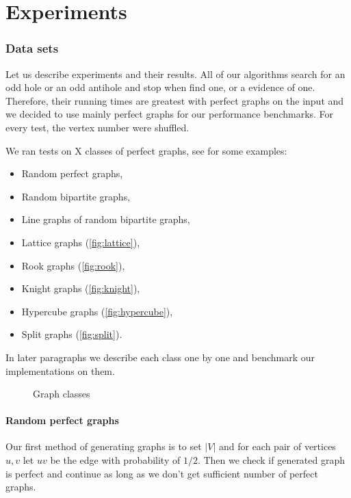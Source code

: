 \section{Experiments}
\label{sec:experiments}

\subsubsection{Data sets}

Let us describe experiments and their results. All of our algorithms search for an odd hole or an odd antihole and stop when find one, or a evidence of one. Therefore, their running times are greatest with perfect graphs on the input and we decided to use mainly perfect graphs for our performance benchmarks. For every test, the vertex number were shuffled.

We ran tests on X classes of perfect graphs, see  for some examples:
\begin{itemize}
  \item Random perfect graphs,
  \item Random bipartite graphs,
  \item Line graphs of random bipartite graphs,
  \item Lattice graphs (\cref{fig:lattice}),
  \item Rook graphs (\cref{fig:rook}),
  \item Knight graphs (\cref{fig:knight}),
  \item Hypercube graphs (\cref{fig:hypercube}),
  \item Split graphs (\cref{fig:split}).
\end{itemize}

In later paragraphs we describe each class one by one and benchmark our implementations on them.

\begin{figure}
  
  \caption{Graph classes}
  \label{fig:graphClasses}
\end{figure}

\paragraph{Random perfect graphs}
Our first method of generating graphs is to set $|V|$ and for each pair of vertices $u, v$ let $uv$ be the edge with probability of $1/2$. Then we check if generated graph is perfect and continue as long as we don't get sufficient number of perfect graphs.

